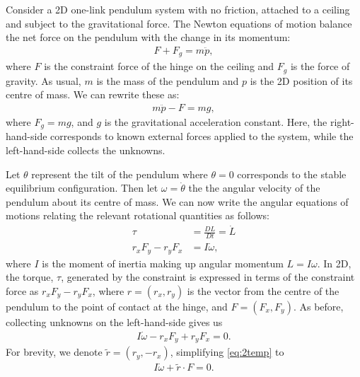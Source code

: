 \documentclass[12pt, reqno]{article}
\begin{document}

\pagestyle{fancy}

\chead{}
\lfoot{}
\cfoot{\thepage}
\rfoot{}
Consider a 2D one-link pendulum system with no friction, attached to a ceiling and subject to the gravitational force. The Newton equations of motion balance the net force on the pendulum with the change in its momentum:
\begin{align*}
F + F_g = m \ddot{p},
\end{align*}
where $F$ is the constraint force of the hinge on the ceiling and $F_g$ is the force of gravity. As usual, $m$ is the mass of the pendulum and $p$ is the 2D position of its centre of mass. We can rewrite these as:
\begin{align}
m \ddot{p} - F = mg, \label{eq:1}
\end{align}
where $F_g = mg$, and $g$ is the gravitational acceleration constant. Here, the right-hand-side corresponds to known external forces applied to the system, while the left-hand-side collects the unknowns.

Let $\theta$ represent the tilt of the pendulum where $\theta = 0$ corresponds to the stable equilibrium configuration. Then let $\omega = \dot{\theta}$ the the angular velocity of the pendulum about its centre of mass. We can now write the angular equations of motions relating the relevant rotational quantities as follows:
\begin{align*}
\tau &= \frac{DL}{Dt} = \dot{L} \\
r_xF_{y} - r_yF_{x} &= I\dot{\omega},
\end{align*}
where $I$ is the moment of inertia making up angular momentum $L = I\omega$. In 2D, the torque, $\tau$, generated by the constraint is expressed in terms of the constraint force as $r_xF_{y} - r_yF_{x}$, where $r = (r_x, r_y)$ is the vector from the centre of the pendulum to the point of contact at the hinge, and $F = (F_x, F_y)$. As before, collecting unknowns on the left-hand-side gives us 
\begin{align*}
I\dot{\omega} - r_xF_{y} + r_yF_{x} = 0. \tag{*} \label{eq:2temp}
\end{align*}
For brevity, we denote $\tilde{r} = (r_y, -r_x)$, simplifying \eqref{eq:2temp} to
\begin{align}
I\dot{\omega} + \tilde{r} \cdot F = 0. \label{eq:2}
\end{align}
\end{document}

